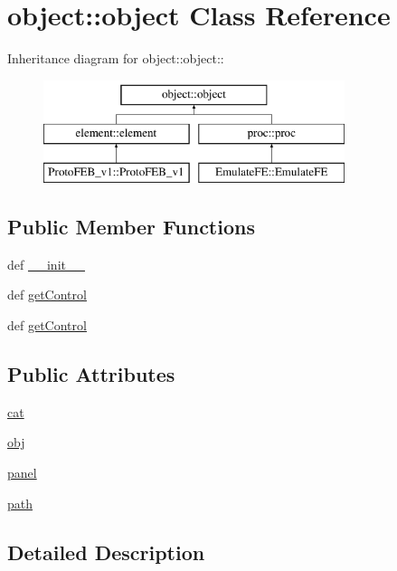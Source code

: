 \hypertarget{classobject_1_1object}{
\section{object::object Class Reference}
\label{classobject_1_1object}
}
Inheritance diagram for object::object::\begin{figure}[H]
\begin{center}
\leavevmode
\includegraphics[height=3cm]{classobject_1_1object}
\end{center}
\end{figure}
\subsection*{Public Member Functions}
\begin{DoxyCompactItemize}
\item 
def \hyperlink{classobject_1_1object_a1220f7c88ee9a71fcfd9acb49a2f44d8}{\_\-\_\-init\_\-\_\-}
\item 
def \hyperlink{classobject_1_1object_ac765747a2b581d48eeb94e600c31fc3f}{getControl}
\item 
def \hyperlink{classobject_1_1object_ac765747a2b581d48eeb94e600c31fc3f}{getControl}
\end{DoxyCompactItemize}
\subsection*{Public Attributes}
\begin{DoxyCompactItemize}
\item 
\hyperlink{classobject_1_1object_a4fbaf843d1f40843b2c3895cb73ffada}{cat}
\item 
\hyperlink{classobject_1_1object_a15f13858ecdbf661a97a7da93d717922}{obj}
\item 
\hyperlink{classobject_1_1object_add82cb657066d4ab5b39035792971503}{panel}
\item 
\hyperlink{classobject_1_1object_a6b4e1fd053496eafff2bc0f8aed7f089}{path}
\end{DoxyCompactItemize}


\subsection{Detailed Description}


